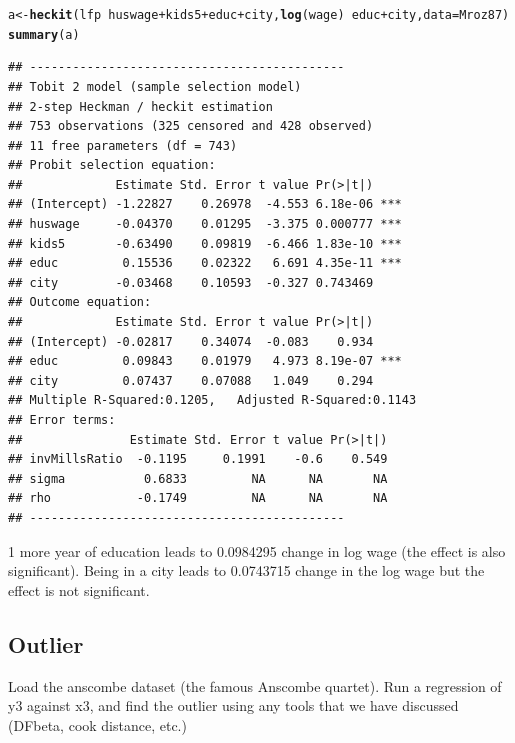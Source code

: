 \documentclass{article}\usepackage[]{graphicx}\usepackage[]{color}
\makeatletter
\newcommand{\hlopt}[1]{\textcolor[rgb]{0,0,0}{#1}}%
\newcommand{\hlstd}[1]{\textcolor[rgb]{0.345,0.345,0.345}{#1}}%
\newcommand{\hlkwb}[1]{\textcolor[rgb]{0.69,0.353,0.396}{#1}}%
\newcommand{\hlkwc}[1]{\textcolor[rgb]{0.333,0.667,0.333}{#1}}%
\newcommand{\hlkwd}[1]{\textcolor[rgb]{0.737,0.353,0.396}{\textbf{#1}}}%
\newenvironment{kframe}{%
 \def\at@end@of@kframe{}%
 \ifinner\ifhmode%
  \def\at@end@of@kframe{\end{minipage}}%
  \begin{minipage}{\columnwidth}%
 \fi\fi%
 \def\FrameCommand##1{\hskip\@totalleftmargin \hskip-\fboxsep
 \colorbox{shadecolor}{##1}\hskip-\fboxsep
     \hskip-\linewidth \hskip-\@totalleftmargin \hskip\columnwidth}%
 \MakeFramed {\advance\hsize-\width
   \@totalleftmargin\z@ \linewidth\hsize
   \@setminipage}}%
 {\par\unskip\endMakeFramed%
 \at@end@of@kframe}
\newenvironment{knitrout}{}{} %
\makeatother
\begin{document}
\begin{knitrout}
\color{fgcolor}\begin{kframe}
\begin{alltt}
\hlstd{a} \hlkwb{<-} \hlkwd{heckit}\hlstd{(lfp} \hlopt{~} \hlstd{huswage} \hlopt{+} \hlstd{kids5} \hlopt{+} \hlstd{educ} \hlopt{+} \hlstd{city,} \hlkwd{log}\hlstd{(wage)} \hlopt{~} \hlstd{educ} \hlopt{+} \hlstd{city,} \hlkwc{data}\hlstd{=Mroz87)}
\hlkwd{summary}\hlstd{(a)}
\end{alltt}
\begin{verbatim}
## --------------------------------------------
## Tobit 2 model (sample selection model)
## 2-step Heckman / heckit estimation
## 753 observations (325 censored and 428 observed)
## 11 free parameters (df = 743)
## Probit selection equation:
##             Estimate Std. Error t value Pr(>|t|)    
## (Intercept) -1.22827    0.26978  -4.553 6.18e-06 ***
## huswage     -0.04370    0.01295  -3.375 0.000777 ***
## kids5       -0.63490    0.09819  -6.466 1.83e-10 ***
## educ         0.15536    0.02322   6.691 4.35e-11 ***
## city        -0.03468    0.10593  -0.327 0.743469    
## Outcome equation:
##             Estimate Std. Error t value Pr(>|t|)    
## (Intercept) -0.02817    0.34074  -0.083    0.934    
## educ         0.09843    0.01979   4.973 8.19e-07 ***
## city         0.07437    0.07088   1.049    0.294    
## Multiple R-Squared:0.1205,	Adjusted R-Squared:0.1143
## Error terms:
##               Estimate Std. Error t value Pr(>|t|)
## invMillsRatio  -0.1195     0.1991    -0.6    0.549
## sigma           0.6833         NA      NA       NA
## rho            -0.1749         NA      NA       NA
## --------------------------------------------
\end{verbatim}
\end{kframe}
\end{knitrout}

1 more year of education leads to 0.0984295 change in log wage (the effect is also significant). Being in a city leads to 0.0743715 change in the log wage but the effect is not significant.

\subsection{Outlier}

Load the anscombe dataset (the famous Anscombe quartet). Run a regression of y3 against x3, and find the outlier using any tools that we have discussed (DFbeta, cook distance, etc.)
\end{document}
